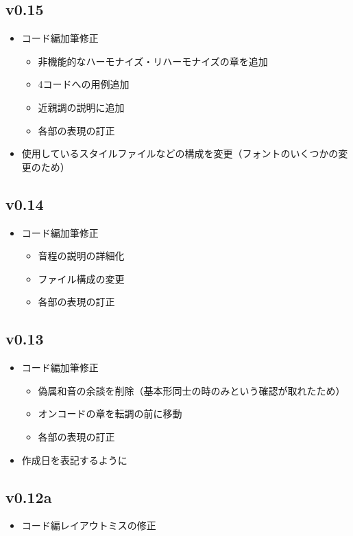 \documentclass[dvipdfmx,uplatex,b5paper,openany,jbase=12Q,nomag*,textwidth-limit=44%
               ]{gachimuchi}[2020/05/05]
\begin{document}
\subsection{v0.15}
\begin{itemize}
  \item コード編加筆修正
  \begin{itemize}
    \item 非機能的なハーモナイズ・リハーモナイズの章を追加
    \item \Sus4コードへの用例追加
    \item 近親調の説明に追加
    \item 各部の表現の訂正
  \end{itemize}
  \item 使用しているスタイルファイルなどの構成を変更（フォントのいくつかの変更のため）
\end{itemize}
\subsection{v0.14}
\begin{itemize}
  \item コード編加筆修正
  \begin{itemize}
    \item 音程の説明の詳細化
    \item ファイル構成の変更
    \item 各部の表現の訂正
  \end{itemize}
\end{itemize}
\subsection{v0.13}
\begin{itemize}
  \item コード編加筆修正
  \begin{itemize}
    \item 偽属和音の余談を削除（基本形同士の時のみという確認が取れたため）
    \item オンコードの章を転調の前に移動
    \item 各部の表現の訂正
  \end{itemize}
  \item 作成日を表記するように
\end{itemize}
\subsection{v0.12a}
\begin{itemize}
  \item コード編レイアウトミスの修正
\end{itemize}
\end{document}
